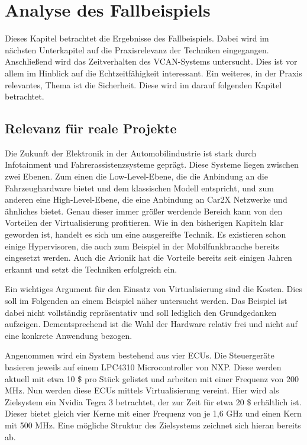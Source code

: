 \documentclass[
  a4paper,					    %
  twoside,
  DIV=calc,     				%
  bibliography=totoc,
  cleardoublepage=empty,
  ngerman,     					%
  final       					%
]{scrbook}
\begin{document}
\chapter{Analyse des Fallbeispiels}
\label{sec:Beispiel_Analyse}
Dieses Kapitel betrachtet die Ergebnisse des Fallbeispiels. Dabei wird im nächsten Unterkapitel auf die Praxisrelevanz der Techniken eingegangen. Anschließend wird das Zeitverhalten des VCAN-Systems untersucht. Dies ist vor allem im Hinblick auf die Echtzeitfähigkeit interessant. Ein weiteres, in der Praxis relevantes, Thema ist die Sicherheit. Diese wird im darauf folgenden Kapitel betrachtet.



\section{Relevanz für reale Projekte}
\label{sec:Relevanz}
Die Zukunft der Elektronik in der Automobilindustrie ist stark durch Infotainment und Fahrerassistenzsysteme geprägt. Diese Systeme liegen zwischen zwei Ebenen. Zum einen die Low-Level-Ebene, die die Anbindung an die Fahrzeughardware bietet und dem klassischen Modell entspricht, und zum anderen eine High-Level-Ebene, die eine Anbindung an Car2X Netzwerke und ähnliches bietet. Genau dieser immer größer werdende Bereich kann von den Vorteilen der Virtualisierung profitieren. Wie in den bisherigen Kapiteln klar geworden ist, handelt es sich um eine ausgereifte Technik. Es existieren schon einige Hypervisoren, die auch zum Beispiel in der Mobilfunkbranche bereits eingesetzt werden. Auch die Avionik hat die Vorteile bereits seit einigen Jahren erkannt und setzt die Techniken erfolgreich ein.

Ein wichtiges Argument für den Einsatz von Virtualisierung sind die Kosten. Dies soll im Folgenden an einem Beispiel näher untersucht werden. Das Beispiel ist dabei nicht vollständig repräsentativ und soll lediglich den Grundgedanken aufzeigen. Dementsprechend ist die Wahl der Hardware relativ frei und nicht auf eine konkrete Anwendung bezogen.

Angenommen wird ein System bestehend aus vier ECUs. Die Steuergeräte basieren jeweils auf einem LPC4310 Microcontroller von NXP. Diese werden aktuell mit etwa 10 \$ pro Stück gelistet und arbeiten mit einer Frequenz von 200 MHz. Nun werden diese ECUs mittels Virtualisierung vereint. Hier wird als Zielsystem ein Nvidia Tegra 3 betrachtet, der zur Zeit für etwa 20 \$ erhältlich ist. Dieser bietet gleich vier Kerne mit einer Frequenz von je 1,6 GHz und einen Kern mit 500 MHz. Eine mögliche Struktur des Zielsystems zeichnet sich hieran bereits ab. 
\end{document}
